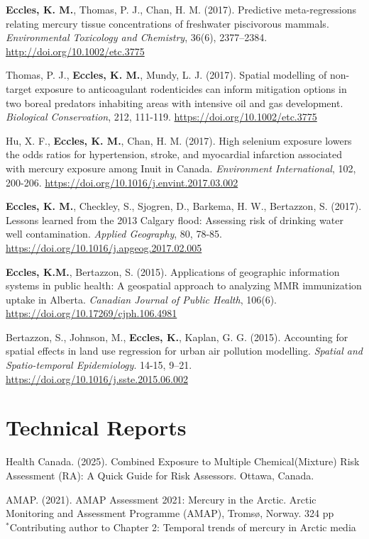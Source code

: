 \documentclass[margin,line]{res}
\begin{document}
\begin{resume}
 \textbf{Eccles, K. M.}, Thomas, P. J., Chan, H. M. (2017). Predictive meta-regressions relating mercury tissue concentrations of freshwater piscivorous mammals. \textit{Environmental Toxicology and Chemistry}, 36(6), 2377–2384. \url{http://doi.org/10.1002/etc.3775}

Thomas, P. J., \textbf{Eccles, K. M.}, Mundy, L. J. (2017). Spatial modelling of non-target exposure to anticoagulant rodenticides can inform mitigation options in two boreal predators inhabiting areas with intensive oil and gas development. \textit{Biological Conservation}, 212, 111-119. \url{https://doi.org/10.1002/etc.3775}

Hu, X. F., \textbf{Eccles, K. M.}, Chan, H. M. (2017). High selenium exposure lowers the odds ratios for hypertension, stroke, and myocardial infarction associated with mercury exposure among Inuit in Canada. \textit{Environment International}, 102, 200-206. \url{https://doi.org/10.1016/j.envint.2017.03.002}

\textbf{Eccles, K. M.}, Checkley, S., Sjogren, D., Barkema, H. W., Bertazzon, S. (2017). Lessons learned from the 2013 Calgary flood: Assessing risk of drinking water well contamination. \textit{Applied Geography}, 80, 78-85. \url{https://doi.org/10.1016/j.apgeog.2017.02.005}

\textbf{Eccles, K.M.}, Bertazzon, S. (2015). Applications of geographic information systems in public health: A geospatial approach to analyzing MMR immunization uptake in Alberta. \textit{Canadian Journal of Public Health}, 106(6). \url{https://doi.org/10.17269/cjph.106.4981}

Bertazzon, S., Johnson, M., \textbf{Eccles, K.}, Kaplan, G. G. (2015). Accounting for spatial effects in land use regression for urban air pollution modelling. \textit{Spatial and Spatio-temporal Epidemiology}. 14-15, 9–21. \url{https://doi.org/10.1016/j.sste.2015.06.002}


\vspace*{.1in}
\section{\sc Technical Reports}
Health Canada. (2025). Combined Exposure to Multiple Chemical(Mixture) Risk Assessment (RA): A Quick Guide for Risk Assessors. Ottawa, Canada.

AMAP. (2021). AMAP Assessment 2021: Mercury in the Arctic. Arctic Monitoring and Assessment Programme (AMAP), Tromsø, Norway. 324 pp\\
$^{*}$Contributing author to Chapter 2: Temporal trends of mercury in Arctic media\\
\vspace*{.1in}


\end{resume}
\end{document}
